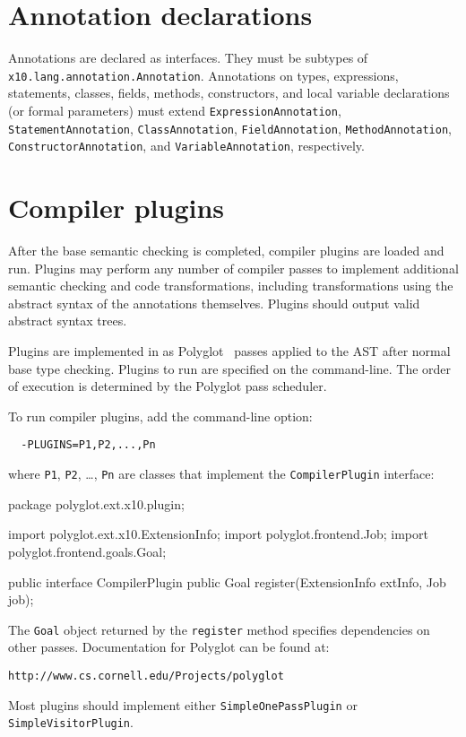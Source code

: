 \section{Annotation declarations}

Annotations are declared as interfaces.  They must be
subtypes of \texttt{x10.lang.annotation.Annotation}.
Annotations on types, expressions, statements, classes, fields,
methods, constructors, and local variable declarations (or
formal parameters)
must extend
\texttt{ExpressionAnnotation},
\texttt{StatementAnnotation},
\texttt{ClassAnnotation},
\texttt{FieldAnnotation},
\texttt{MethodAnnotation},
\texttt{ConstructorAnnotation}, and
\texttt{VariableAnnotation}, respectively.

\section{Compiler plugins}

After the base \Xten{} semantic checking is completed, 
compiler plugins are loaded and run.  Plugins may perform
any number of compiler passes to implement
additional semantic checking and code transformations, including
transformations using the abstract syntax of the annotations
themselves.  Plugins should output valid \Xten{} abstract
syntax trees.

Plugins are implemented in \Java{} as
Polyglot~\cite{ncm03} passes applied to the AST
after normal base \Xten{} type checking.
Plugins to run are specified on the command-line.  The order of
execution is determined by the Polyglot pass scheduler.

To run compiler plugins, add the command-line option:
\begin{verbatim}
  -PLUGINS=P1,P2,...,Pn
\end{verbatim}
where \texttt{P1}, \texttt{P2}, \dots, \texttt{Pn} are classes that implement the
\texttt{CompilerPlugin} interface:

\begin{xten}
package polyglot.ext.x10.plugin;

import polyglot.ext.x10.ExtensionInfo;
import polyglot.frontend.Job;
import polyglot.frontend.goals.Goal;

public interface CompilerPlugin {
  public Goal
    register(ExtensionInfo extInfo, Job job);
}
\end{xten}

The \texttt{Goal} object returned by the \texttt{register} method specifies dependencies on other passes.
Documentation for Polyglot can be found at:
\begin{verbatim}
http://www.cs.cornell.edu/Projects/polyglot
\end{verbatim}
Most plugins should implement either \texttt{SimpleOnePassPlugin} or
\texttt{SimpleVisitorPlugin}.

